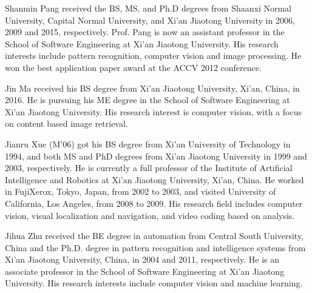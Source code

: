 \documentclass[journal]{IEEEtran}
\begin{document}
\begin{IEEEbiography}{Shanmin Pang} received the BS, MS, and Ph.D degrees from Shaanxi Normal University, Capital Normal University, and Xi'an Jiaotong University
in 2006, 2009 and 2015, respectively.
Prof. Pang is now an assistant professor in the School of Software Engineering at Xi'an Jiaotong University. His research interests include pattern recognition, computer vision and image processing. He won the best application paper award at the ACCV 2012 conference.
\end{IEEEbiography}

\begin{IEEEbiography}{Jin Ma}
received his BS degree  from Xi'an Jiaotong University, Xi'an, China, in 2016.
He is pursuing his ME degree in the School of Software Engineering at Xi'an Jiaotong University.
His research interest is computer vision, with a focus on content based image retrieval.
\end{IEEEbiography}


\begin{IEEEbiography}{Jianru Xue} (M'06)
got his BS degree from Xi'an University of Technology in 1994, and both MS and PhD degrees from Xi'an Jiaotong University in 1999
and 2003, respectively.
He is currently a full professor of the Institute of Artificial Intelligence and Robotics at Xi'an Jiaotong University, Xi'an,
China. He worked in FujiXerox, Tokyo, Japan, from 2002 to 2003, and visited University
of California, Los Angeles, from 2008 to 2009. His research field includes computer vision, visual localization and navigation, and video
coding based on analysis.
\end{IEEEbiography}

\begin{IEEEbiography}{Jihua Zhu}
received the BE degree in automation from Central South University, China and the Ph.D. degree in pattern recognition and intelligence systems from Xi'an Jiaotong University, China, in 2004 and 2011, respectively.
He is an associate professor in the School of Software Engineering at Xi'an Jiaotong University.
His research interests include computer vision and machine learning.
\end{IEEEbiography}
\end{document}
